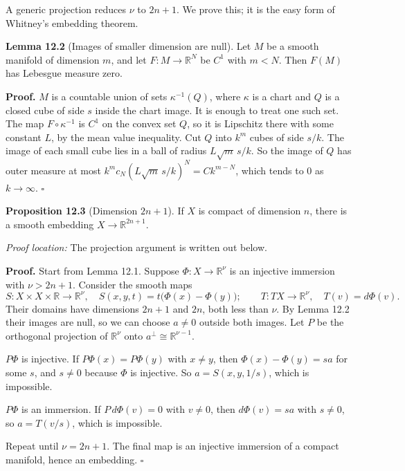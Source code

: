 \documentclass[
  11pt,
]{article}
\begin{document}
A generic projection reduces \(\nu\) to \(2n+1\). We prove this; it is
the easy form of Whitney's embedding theorem.

\textbf{Lemma 12.2} (Images of smaller dimension are null). Let \(M\) be
a smooth manifold of dimension \(m\), and let \(F:M\to\mathbb R^N\) be
\(C^1\) with \(m<N\). Then \(F(M)\) has Lebesgue measure zero.

\textbf{Proof.} \(M\) is a countable union of sets \(\kappa^{-1}(Q)\),
where \(\kappa\) is a chart and \(Q\) is a closed cube of side \(s\)
inside the chart image. It is enough to treat one such set. The map
\(F\circ\kappa^{-1}\) is \(C^1\) on the convex set \(Q\), so it is
Lipschitz there with some constant \(L\), by the mean value inequality.
Cut \(Q\) into \(k^m\) cubes of side \(s/k\). The image of each small
cube lies in a ball of radius \(L\sqrt m\,s/k\). So the image of \(Q\)
has outer measure at most \(k^m c_N(L\sqrt m\,s/k)^N=Ck^{m-N}\), which
tends to \(0\) as \(k\to\infty\). \(\square\)

\textbf{Proposition 12.3} (Dimension \(2n+1\)). If \(X\) is compact of
dimension \(n\), there is a smooth embedding \(X\to\mathbb R^{2n+1}\).

\emph{Proof location:} The projection argument is written out below.

\textbf{Proof.} Start from Lemma 12.1. Suppose
\(\Phi:X\to\mathbb R^\nu\) is an injective immersion with \(\nu>2n+1\).
Consider the smooth maps \[
S:X\times X\times\mathbb R\to\mathbb R^\nu,\quad S(x,y,t)=t\bigl(\Phi(x)-\Phi(y)\bigr);\qquad
T:TX\to\mathbb R^\nu,\quad T(v)=d\Phi(v).
\] Their domains have dimensions \(2n+1\) and \(2n\), both less than
\(\nu\). By Lemma 12.2 their images are null, so we can choose
\(a\neq0\) outside both images. Let \(P\) be the orthogonal projection
of \(\mathbb R^\nu\) onto \(a^\perp\cong\mathbb R^{\nu-1}\).

\(P\Phi\) is injective. If \(P\Phi(x)=P\Phi(y)\) with \(x\neq y\), then
\(\Phi(x)-\Phi(y)=sa\) for some \(s\), and \(s\neq0\) because \(\Phi\)
is injective. So \(a=S(x,y,1/s)\), which is impossible.

\(P\Phi\) is an immersion. If \(P\,d\Phi(v)=0\) with \(v\neq0\), then
\(d\Phi(v)=sa\) with \(s\neq0\), so \(a=T(v/s)\), which is impossible.

Repeat until \(\nu=2n+1\). The final map is an injective immersion of a
compact manifold, hence an embedding. \(\square\)
\end{document}
